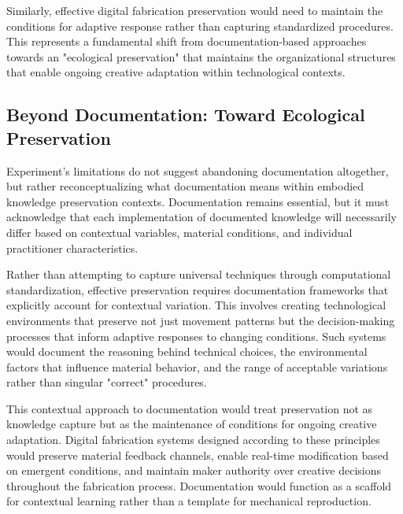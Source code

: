 \vspace{0.5cm}

Similarly, effective digital fabrication preservation would need to maintain the conditions for adaptive response rather than capturing standardized procedures. This represents a fundamental shift from documentation-based approaches towards an "ecological preservation" that maintains the organizational structures that enable ongoing creative adaptation within technological contexts.







\subsection{Beyond Documentation: Toward Ecological Preservation}

Experiment's limitations do not suggest abandoning documentation altogether, but rather reconceptualizing what documentation means within embodied knowledge preservation contexts. Documentation remains essential, but it must acknowledge that each implementation of documented knowledge will necessarily differ based on contextual variables, material conditions, and individual practitioner characteristics.

\vspace{0.5cm}

Rather than attempting to capture universal techniques through computational standardization, effective preservation requires documentation frameworks that explicitly account for contextual variation. This involves creating technological environments that preserve not just movement patterns but the decision-making processes that inform adaptive responses to changing conditions. Such systems would document the reasoning behind technical choices, the environmental factors that influence material behavior, and the range of acceptable variations rather than singular "correct" procedures.

\vspace{0.5cm}

This contextual approach to documentation would treat preservation not as knowledge capture but as the maintenance of conditions for ongoing creative adaptation. Digital fabrication systems designed according to these principles would preserve material feedback channels, enable real-time modification based on emergent conditions, and maintain maker authority over creative decisions throughout the fabrication process. Documentation would function as a scaffold for contextual learning rather than a template for mechanical reproduction.

